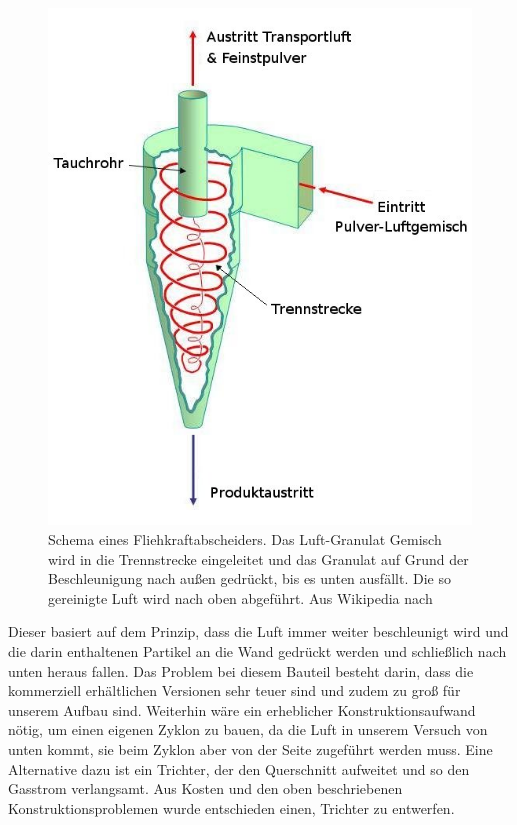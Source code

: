 \begin{figure}[h!]
	\begin{center}
		\includegraphics[scale=0.4]{Umsetzung_Fliehkraftabscheider.jpg}
		\caption[Funktionsweise Fliehkraftabscheider]{Schema eines Fliehkraftabscheiders. Das Luft-Granulat Gemisch wird in die Trennstrecke eingeleitet und das Granulat auf Grund der Beschleunigung nach außen gedrückt, bis es unten ausfällt. Die so gereinigte Luft wird nach oben abgeführt. Aus Wikipedia nach \cite{Loeffler1988}}
	\end{center}
\end{figure}

Dieser basiert auf dem Prinzip, dass die Luft immer weiter beschleunigt wird und die darin enthaltenen Partikel an die Wand gedrückt werden und schließlich nach unten heraus fallen. Das Problem bei diesem Bauteil besteht darin, dass die kommerziell erhältlichen Versionen sehr teuer sind und zudem zu groß für unserem Aufbau sind. 
Weiterhin wäre ein erheblicher Konstruktionsaufwand nötig, um einen eigenen Zyklon zu bauen, da die Luft in unserem Versuch von unten kommt, sie beim Zyklon aber von der Seite zugeführt werden muss. Eine Alternative dazu ist ein Trichter, der den Querschnitt aufweitet und so den Gasstrom verlangsamt. Aus Kosten und den oben beschriebenen Konstruktionsproblemen wurde entschieden einen, Trichter zu entwerfen.


